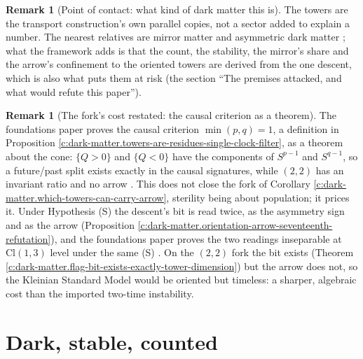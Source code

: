 \documentclass[11pt]{article}
\theoremstyle{definition}
\newtheorem{remark}[theorem]{Remark}
\theoremstyle{plain}
\providecommand{\Cl}{}\renewcommand{\Cl}{\mathrm{Cl}}
\begin{document}
\begin{remark}[Point of contact: what kind of dark matter this is]\label{c:note.dark-matter.point-contact-what-kind-dark-matter}
The towers are the transport construction's own parallel copies, not a sector added to explain a number. The nearest relatives are mirror matter and asymmetric dark matter \cite{FootMirror2004, Zurek2014}; what the framework adds is that the count, the stability, the mirror's share and the arrow's confinement to the oriented towers are derived from the one descent, which is also what puts them at risk (the section ``The premises attacked, and what would refute this paper'').
\end{remark}

\begin{remark}[The fork's cost restated: the causal criterion as a theorem]\label{c:note.dark-matter.forks-cost-restated-causal-criterion-theorem}
The foundations paper proves the causal criterion $\min(p, q) = 1$, a definition in Proposition \ref{c:dark-matter.towers-are-residues-single-clock-filter}, as a theorem about the cone: $\{Q > 0\}$ and $\{Q < 0\}$ have the components of $S^{p-1}$ and $S^{q-1}$, so a future/past split exists exactly in the causal signatures, while $(2,2)$ has an invariant ratio and no arrow \cite[Lem.~4.4(iv)]{ButlerT16}. This does not close the fork of Corollary \ref{c:dark-matter.which-towers-can-carry-arrow}, sterility being about population; it prices it. Under Hypothesis (S) the descent's bit is read twice, as the asymmetry sign and as the arrow (Proposition \ref{c:dark-matter.orientation-arrow-seventeenth-refutation}), and the foundations paper proves the two readings inseparable at $\Cl(1,3)$ level under the same (S) \cite[Cor.~5.7]{ButlerT16}. On the $(2,2)$ fork the bit exists (Theorem \ref{c:dark-matter.flag-bit-exists-exactly-tower-dimension}) but the arrow does not, so the Kleinian Standard Model would be oriented but timeless: a sharper, algebraic cost than the imported two-time instability.
\end{remark}

\section{Dark, stable, counted}
\end{document}
